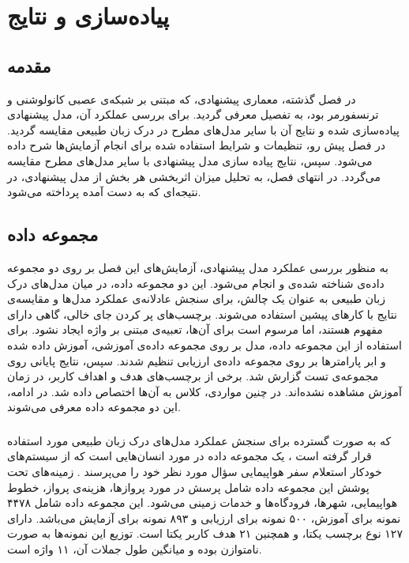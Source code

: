\chapter{پیاده‌سازی و نتایج}
\pagebreak
\section{مقدمه}
در فصل گذشته، معماری پیشنهادی، که مبتنی بر شبکه‌ی عصبی کانولوشنی و ترنسفورمر بود، به تفصیل معرفی گردید. برای بررسی عملکرد آن، مدل پیشنهادی پیاده‌سازی شده و نتایج آن با سایر مدل‌های مطرح در درک زبان طبیعی مقایسه گردید. در فصل پیش رو، تنظیمات و شرایط استفاده شده برای انجام آزمایش‌ها شرح داده می‌شود. سپس، نتایج پیاده سازی مدل پیشنهادی با سایر مدل‌های مطرح مقایسه می‌گردد. در انتهای فصل، به تحلیل میزان اثربخشی هر بخش از مدل پیشنهادی، در نتیجه‌ای که به دست آمده پرداخته می‌شود. 

\section{مجموعه داده}
به منظور بررسی عملکرد مدل پیشنهادی، آزمایش‌های این فصل بر روی دو مجموعه داده‌ی شناخته شده‌ی  و  انجام می‌شود. این دو مجموعه داده، در میان مدل‌های درک زبان طبیعی به عنوان یک چالش، برای سنجش عادلانه‌ی عملکرد مدل‌ها و مقایسه‌ی نتایج با کارهای پیشین استفاده می‌شوند. برچسب‌های پر کردن جای خالی، گاهی دارای مفهوم هستند، اما مرسوم است برای آن‌ها، تعبیه‌ی مبتنی بر واژه ایجاد نشود. برای استفاده از این مجموعه داده، مدل بر روی مجموعه داده‌ی آموزشی، آموزش داده شده و ابر پارامترها بر روی مجموعه داده‌ی ارزیابی تنظیم شدند. سپس، نتایج پایانی روی مجموعه‌ی تست گزارش شد. برخی از برچسب‌های هدف و اهداف کاربر، در زمان آموزش مشاهده نشده‌اند. در چنین مواردی، کلاس  به آن‌ها اختصاص داده شد. در ادامه، این دو مجموعه داده معرفی می‌شوند.
\subsection{}
که به صورت گسترده برای سنجش عملکرد مدل‌های درک زبان طبیعی مورد استفاده قرار گرفته است \cite{5700816}، یک مجموعه داده در مورد انسان‌هایی است که از سیستم‌های خودکار استعلام سفر هواپیمایی سؤال مورد نظر خود را می‌پرسند \cite{atis:hemphill1990}. زمینه‌های تحت پوشش این مجموعه داده شامل پرسش در مورد پروازها، هزینه‌ی پرواز، خطوط هواپیمایی، شهرها، فرودگاه‌ها و خدمات زمینی می‌شود. این مجموعه داده شامل ۴۴۷۸ نمونه برای آموزش، ۵۰۰ نمونه برای ارزیابی و ۸۹۳ نمونه برای آزمایش می‌باشد.  دارای ۱۲۷ نوع برچسب یکتا، و همچنین ۲۱ هدف کاربر یکتا است. توزیع این نمونه‌ها به صورت نامتوازن بوده و میانگین طول جملات آن، ۱۱ واژه است.
